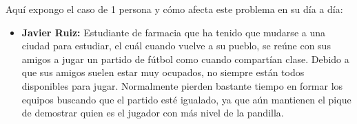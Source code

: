 Aquí expongo el caso de 1 persona y cómo afecta este problema en su día a día:

\begin{itemize}
    \item \textbf{Javier Ruiz:} Estudiante de farmacia que ha tenido que mudarse a una ciudad para estudiar, el cuál cuando vuelve a su pueblo,
     se reúne con sus amigos a jugar un partido de fútbol como cuando compartían clase. Debido a que sus amigos suelen estar muy ocupados,
     no siempre están todos disponibles para jugar. Normalmente pierden bastante tiempo en formar los equipos buscando que el partido esté igualado,
     ya que aún mantienen el pique de demostrar quien es el jugador con más nivel de la pandilla. 
\end{itemize}
